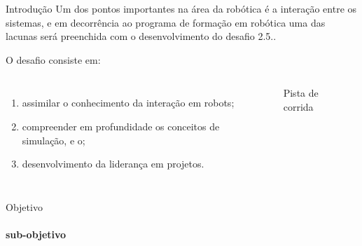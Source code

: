 \begin{frame}[t]{Introdução} 
    \transdissolve[duration=0.5]
    Um dos pontos importantes na área da robótica é a interação entre os sistemas, e em decorrência ao programa de formação em robótica uma das lacunas será preenchida com o desenvolvimento do desafio 2.5..

    O desafio consiste em:
        \begin{columns}[t]
                \begin{enumerate}
                    \item assimilar o conhecimento da interação em robots;
                    \item compreender em profundidade os conceitos de simulação, e o;
                    \item desenvolvimento da liderança em projetos.
                \end{enumerate}
            \begin{center}
                \begin{figure}
                    \caption{Pista de corrida \cite{agostini2007}}
                \end{figure}
            \end{center}
        \end{columns}
\end{frame}
\begin{frame}[c]{Objetivo} 
    \framesubtitle{sub-objetivo}
    \transdissolve[duration=0.5]
   
    \begin{center}
    \end{center}
    
   
\end{frame}
